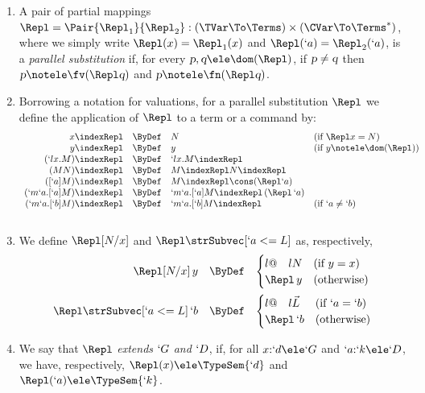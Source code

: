 \documentclass{CSML}
\newcommand{\vect}[1]{\vec{#1}}
\begin{document}
 \begin{defi} \label{Repl definition}\hfill
 \begin{enumerate}
 \item
A pair of partial mappings $ \Repl =\Pair{\Repl_1}{\Repl_2}: (\TVar\To\Terms) \times (\CVar\To\Terms^*)$, where we simply write $\Repl(x) = \Repl_1(x)$ and
$\Repl(`a) = \Repl_2(`a)$,
is a \emph{parallel substitution} if, for every $\textsl{p},\textsl{q} \ele \dom (\Repl) $, if $\textsl{p}\not=\textsl{q}$ then $\textsl{p} \notele \fv(\Repl \textsl{q})$ and $\textsl{p} \notele \fn(\Repl \textsl{q})$.

 \item
Borrowing a notation for valuations, for a parallel substitution $\Repl$ we define the application of $\Repl$ to a term or a command by:
%
\[ \begin{array}{rcl@{\quad}l}
x \indexRepl & \ByDef & N & (\textrm{if } \Repl x = N) 
	\\
y \indexRepl & \ByDef & y & (\textrm{if } y \notele \dom(\Repl) )
	\\
(`l x.M) \indexRepl & \ByDef & `l x.M \indexRepl 
	\\
(MN) \indexRepl & \ByDef & M \indexRepl N \indexRepl \\
([`a]M) \indexRepl & \ByDef & M \indexRepl \cons (\Repl `a) \\
(`m`a .[`a]M) \indexRepl &\ByDef & `m`a .[`a] M \indexRepl \, (\Repl \,`a) \\
 (`m`a .[`b]M) \indexRepl &\ByDef & `m`a .[`b] M \indexRepl & (\textrm{if } `a \neq `b) \\ 
 \\ 
 \end{array} \]

 \item
We define $ \Repl [ N/x ]$ and $ \Repl \strSubvec[ `a <= L ] $ as, respectively,
%
 \[ \begin{array}{rcl}
 \Repl [ N/x ] \, y &\ByDef& 
 \begin{cases}{l@{\quad}l}
N & (\textrm{if } y=x) \\
 \Repl \, y & (\textrm{otherwise})
 \end{cases}
 \\ [5mm]
 \Repl \strSubvec[ `a <= L ] \, `b &\ByDef& 
 \begin{cases}{l@{\quad}l}
 \vect{L} & (\textrm{if } `a=`b) \\
 \Repl \, `b & (\textrm{otherwise})
 \end{cases}
 \end{array} \]

 \item
We say that $\Repl$ \emph{extends} $`G$ \emph{and} $`D $, if, for all $x{:}`d \ele `G$
and $`a{:}`k \ele `D $, we have, respectively, $\Repl (x) \ele \TypeSem{`d}$ and $\Repl (`a) \ele \TypeSem{`k}$.

 \end{enumerate}
 \end{defi}
\end{document}
